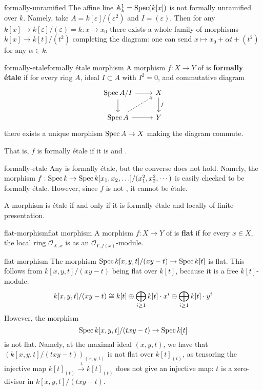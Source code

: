 \begin{example}{formally-unramified}
    The affine line $\mathbb{A}^1_k = \operatorname{Spec}(k[x])$ is not formally unramified over $k$. Namely, take $A = k[\varepsilon] / (\varepsilon^2)$ and $I = (\varepsilon)$. Then for any $k[x] \to k[\varepsilon]/(\varepsilon) = k : x \mapsto x_0$ there exists a whole family of morphisms $k[x] \to k[t]/(t^2)$ completing the diagram: one can send $x \mapsto x_0 + \alpha t + (t^2)$ for any $\alpha \in k$.
\end{example}

\begin{topic}{formally-etale}{formally étale morphism}
    A morphism $f : X \to Y$ of  is \textbf{formally étale} if for every ring $A$, ideal $I \subset A$ with $I^2 = 0$, and commutative diagram
    \[ \begin{tikzcd} \Spec A/I \arrow{r} \arrow{d} & X \arrow{d}{f} \\ \Spec A \arrow{r} \arrow[dashed]{ur} & Y \end{tikzcd} \]
    there exists a unique morphism $\operatorname{Spec} A \to X$ making the diagram commute.
    
    That is, $f$ is formally étale if it is  and .
\end{topic}

\begin{example}{formally-etale}
    Any  is formally étale, but the converse does not hold. Namely, the morphism $f : \operatorname{Spec} k \to \operatorname{Spec} k[x_1, x_2, \ldots] / (x_1^2, x_2^2, \cdots)$ is easily checked to be formally étale. However, since $f$ is not , it cannot be étale.
    
    A morphism is étale if and only if it is formally étale and locally of finite presentation.
\end{example}

\begin{topic}{flat-morphism}{flat morphism}
    A morphism $f : X \to Y$ of  is \textbf{flat} if for every $x \in X$, the local ring $\mathcal{O}_{X, x}$ is  as an $\mathcal{O}_{Y, f(x)}$-module.
\end{topic}

\begin{example}{flat-morphism}
    The morphism $\operatorname{Spec} k[x, y, t] / (xy - t) \to \operatorname{Spec} k[t]$ is flat. This follows from $k[x, y, t] / (xy - t)$ being flat over $k[t]$, because it is a free $k[t]$-module:
    \[ k[x, y, t] / (xy - t) \cong k[t] \oplus \bigoplus_{i \ge 1} k[t] \cdot x^i \oplus \bigoplus_{i \ge 1} k[t] \cdot y^i \]
    However, the morphism
    \[ \operatorname{Spec} k[x, y, t] / (txy - t) \to \operatorname{Spec} k[t] \]
    is not flat. Namely, at the maximal ideal $(x, y, t)$, we have that $(k[x, y, t] / (txy - t))_{(x, y, t)}$ is not flat over $k[t]_{(t)}$, as tensoring the injective map $k[t]_{(t)} \xrightarrow{\cdot t} k[t]_{(t)}$ does not give an injective map: $t$ is a zero-divisor in $k[x, y, t] / (txy - t)$.
\end{example}

